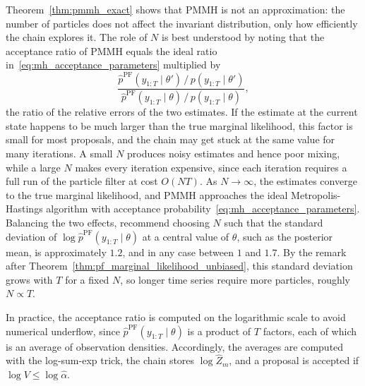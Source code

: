 Theorem~\ref{thm:pmmh_exact} shows that PMMH is not an approximation: the number of particles does not affect the invariant distribution, only how efficiently the chain explores it. The role of $N$ is best understood by noting that the acceptance ratio of PMMH equals the ideal ratio in~\eqref{eq:mh_acceptance_parameters} multiplied by
\begin{equation}
    \frac{\hat{p}^{\mathrm{PF}}(y_{1:T}\mid\theta')\,/\,p(y_{1:T}\mid\theta')}{\hat{p}^{\mathrm{PF}}(y_{1:T}\mid\theta)\,/\,p(y_{1:T}\mid\theta)},
\end{equation}
the ratio of the relative errors of the two estimates. If the estimate at the current state happens to be much larger than the true marginal likelihood, this factor is small for most proposals, and the chain may get stuck at the same value for many iterations. A small $N$ produces noisy estimates and hence poor mixing, while a large $N$ makes every iteration expensive, since each iteration requires a full run of the particle filter at cost $O(NT)$. As $N\to\infty$, the estimates converge to the true marginal likelihood, and PMMH approaches the ideal Metropolis-Hastings algorithm with acceptance probability~\eqref{eq:mh_acceptance_parameters}. Balancing the two effects, \cite{doucet2015efficient} recommend choosing $N$ such that the standard deviation of $\log\hat{p}^{\mathrm{PF}}(y_{1:T}\mid\theta)$ at a central value of $\theta$, such as the posterior mean, is approximately $1.2$, and in any case between $1$ and $1.7$. By the remark after Theorem~\ref{thm:pf_marginal_likelihood_unbiased}, this standard deviation grows with $T$ for a fixed $N$, so longer time series require more particles, roughly $N\propto T$.

In practice, the acceptance ratio is computed on the logarithmic scale to avoid numerical underflow, since $\hat{p}^{\mathrm{PF}}(y_{1:T}\mid\theta)$ is a product of $T$ factors, each of which is an average of observation densities. 
Accordingly, the averages are computed with the log-sum-exp trick, the chain stores $\log\hat{Z}_m$, and a proposal is accepted if $\log V\le\log\hat{\alpha}$.

